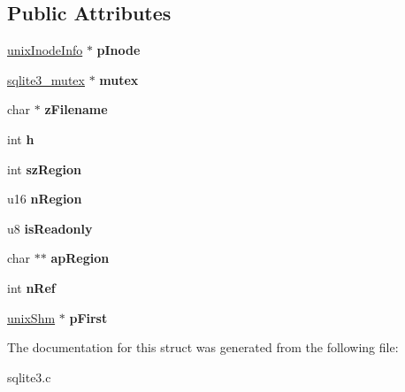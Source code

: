 \subsection*{Public Attributes}
\begin{DoxyCompactItemize}
\item 
\hyperlink{structunixInodeInfo}{unix\+Inode\+Info} $\ast$ {\bfseries p\+Inode}\hypertarget{structunixShmNode_ab6bc1cf84d65887a3395da6406843817}{}\label{structunixShmNode_ab6bc1cf84d65887a3395da6406843817}

\item 
\hyperlink{structsqlite3__mutex}{sqlite3\+\_\+mutex} $\ast$ {\bfseries mutex}\hypertarget{structunixShmNode_aa90850530f48fec6f2a872874f8ddf1f}{}\label{structunixShmNode_aa90850530f48fec6f2a872874f8ddf1f}

\item 
char $\ast$ {\bfseries z\+Filename}\hypertarget{structunixShmNode_a188c3bc5fcb4666ad0817ac093e7505d}{}\label{structunixShmNode_a188c3bc5fcb4666ad0817ac093e7505d}

\item 
int {\bfseries h}\hypertarget{structunixShmNode_a9cd93c8052eb47f257e2d752e8f1fdba}{}\label{structunixShmNode_a9cd93c8052eb47f257e2d752e8f1fdba}

\item 
int {\bfseries sz\+Region}\hypertarget{structunixShmNode_ae8126f9db70a758c2f340ec06869e02b}{}\label{structunixShmNode_ae8126f9db70a758c2f340ec06869e02b}

\item 
u16 {\bfseries n\+Region}\hypertarget{structunixShmNode_aaf1fceb640b3959424403885c0419a46}{}\label{structunixShmNode_aaf1fceb640b3959424403885c0419a46}

\item 
u8 {\bfseries is\+Readonly}\hypertarget{structunixShmNode_ad241b0a85f01110310cea91aa38fccb2}{}\label{structunixShmNode_ad241b0a85f01110310cea91aa38fccb2}

\item 
char $\ast$$\ast$ {\bfseries ap\+Region}\hypertarget{structunixShmNode_a8eff550f9b10a2de463e9874f84efc5e}{}\label{structunixShmNode_a8eff550f9b10a2de463e9874f84efc5e}

\item 
int {\bfseries n\+Ref}\hypertarget{structunixShmNode_a6d9f0c9dec3f6710cb09c90723a8284b}{}\label{structunixShmNode_a6d9f0c9dec3f6710cb09c90723a8284b}

\item 
\hyperlink{structunixShm}{unix\+Shm} $\ast$ {\bfseries p\+First}\hypertarget{structunixShmNode_a0ddd6c4625acf5994a60b0c368bc665e}{}\label{structunixShmNode_a0ddd6c4625acf5994a60b0c368bc665e}

\end{DoxyCompactItemize}


The documentation for this struct was generated from the following file\+:\begin{DoxyCompactItemize}
\item 
sqlite3.\+c\end{DoxyCompactItemize}
